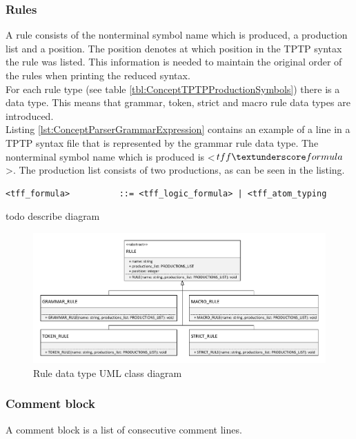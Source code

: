 \subsubsection{Rules}
A rule consists of the nonterminal symbol name which is produced, a production list and a position.
The position denotes at which position in the \ac{TPTP} syntax the rule was listed.
This information is needed to maintain the original order of the rules when printing the reduced syntax.\\
For each rule type (see table \ref{tbl:ConceptTPTPProductionSymbols}) there is a data type.
This means that grammar, token, strict and macro rule data types are introduced.\\
Listing \ref{lst:ConceptParserGrammarExpression} contains an example of a line in a \ac{TPTP} syntax file that is represented by the grammar rule data type.
The nonterminal symbol name which is produced is <$tff \textunderscore formula$>.  The production list consists of two productions, as can be seen in the listing.
\begin{lstlisting}[basicstyle=\scriptsize	,caption= Grammar expression,label= lst:ConceptParserGrammarExpression]
<tff_formula>          ::= <tff_logic_formula> | <tff_atom_typing
\end{lstlisting}


todo describe diagram
\begin{figure}[H]
\centering
\includegraphics[width=1\textwidth]{images/Concept_uml_data_types_rules.pdf}
\caption{Rule data type UML class diagram}
\label{fig:ConceptRulesClassDiagram}
\end{figure}

\subsubsection{Comment block}
A comment block is a list of consecutive comment lines.

